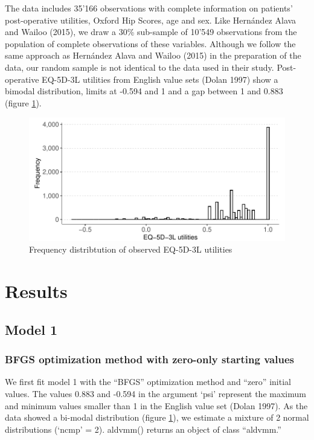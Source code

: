 \documentclass[
]{article}
\begin{document}
The data includes 35'166 observations with complete information on patients' post-operative utilities, Oxford Hip Scores, age and sex. Like Hernández Alava and Wailoo (2015), we draw a 30\% sub-sample of 10'549 observations from the population of complete observations of these variables. Although we follow the same approach as Hernández Alava and Wailoo (2015) in the preparation of the data, our random sample is not identical to the data used in their study. Post-operative EQ-5D-3L utilities from English value sets (Dolan 1997) show a bimodal distribution, limits at -0.594 and 1 and a gap between 1 and 0.883 (figure \ref{fig:plot-hist-obs}).

\begin{figure}
\centering
\includegraphics{aldvmm_vignette_files/figure-latex/plot-hist-obs-1.pdf}
\caption{\label{fig:plot-hist-obs}Frequency distribtution of observed EQ-5D-3L utilities}
\end{figure}

\hypertarget{results}{%
\section{Results}\label{results}}

\hypertarget{model-1}{%
\subsection{Model 1}\label{model-1}}

\hypertarget{sec:base}{%
\subsubsection{BFGS optimization method with zero-only starting values}\label{sec:base}}

We first fit model 1 with the ``BFGS'' optimization method and ``zero'' initial values. The values 0.883 and -0.594 in the argument `psi' represent the maximum and minimum values smaller than 1 in the English value set (Dolan 1997). As the data showed a bi-modal distribution (figure \ref{fig:plot-hist-obs}), we estimate a mixture of 2 normal distributions (`ncmp' = 2). aldvmm() returns an object of class ``aldvmm.''
\end{document}
